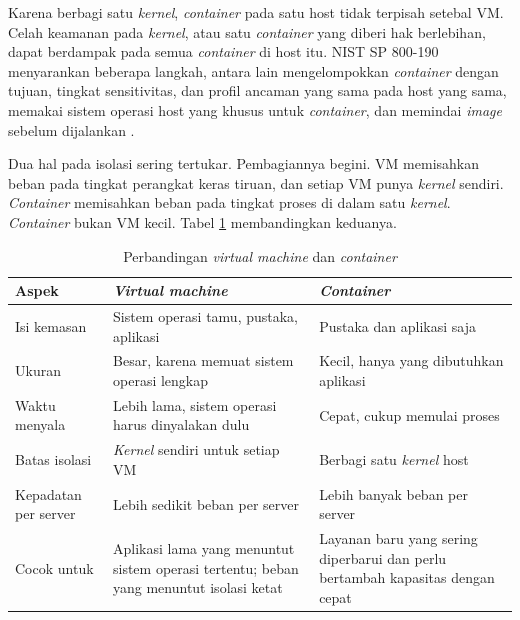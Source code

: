 Karena berbagi satu \textit{kernel}, \textit{container} pada satu host tidak terpisah setebal VM.
Celah keamanan pada \textit{kernel}, atau satu \textit{container} yang diberi hak berlebihan, dapat
berdampak pada semua \textit{container} di host itu. NIST SP 800-190 menyarankan beberapa langkah,
antara lain mengelompokkan \textit{container} dengan tujuan, tingkat sensitivitas, dan profil
ancaman yang sama pada host yang sama, memakai sistem operasi host yang khusus untuk
\textit{container}, dan memindai \textit{image} sebelum dijalankan \cite{c08-nist800-190}.

Dua hal pada isolasi sering tertukar. Pembagiannya begini. VM memisahkan beban pada tingkat
perangkat keras tiruan, dan setiap VM punya \textit{kernel} sendiri. \textit{Container} memisahkan
beban pada tingkat proses di dalam satu \textit{kernel}. \textit{Container} bukan VM kecil.
Tabel \ref{tab:ch08-vm-vs-container} membandingkan keduanya.

\begin{table}[!htb]
  \centering
  \caption{Perbandingan \textit{virtual machine} dan \textit{container}}
  \label{tab:ch08-vm-vs-container}
  \footnotesize
  \begin{tabularx}{\textwidth}{>{\raggedright\arraybackslash}p{2.4cm}
      >{\raggedright\arraybackslash}X >{\raggedright\arraybackslash}X}
    \hline
    \textbf{Aspek} & \textbf{\textit{Virtual machine}} & \textbf{\textit{Container}} \\ \hline
    Isi kemasan & Sistem operasi tamu, pustaka, aplikasi & Pustaka dan aplikasi saja \\ \hline
    Ukuran & Besar, karena memuat sistem operasi lengkap & Kecil, hanya yang dibutuhkan aplikasi \\ \hline
    Waktu menyala & Lebih lama, sistem operasi harus dinyalakan dulu & Cepat, cukup memulai
      proses \\ \hline
    Batas isolasi & \textit{Kernel} sendiri untuk setiap VM & Berbagi satu \textit{kernel} host \\ \hline
    Kepadatan per server & Lebih sedikit beban per server & Lebih banyak beban per server \\ \hline
    Cocok untuk & Aplikasi lama yang menuntut sistem operasi tertentu; beban yang menuntut isolasi
      ketat & Layanan baru yang sering diperbarui dan perlu bertambah kapasitas dengan cepat \\ \hline
  \end{tabularx}
\end{table}

